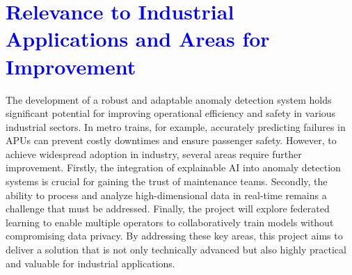 \documentclass[11pt,a4paper]{article}
\begin{document}
\section*{\textcolor{blue}{Relevance to Industrial Applications and Areas for Improvement}}

The development of a robust and adaptable anomaly detection system holds significant potential for improving operational efficiency and safety in various industrial sectors. In metro trains, for example, accurately predicting failures in APUs can prevent costly downtimes and ensure passenger safety. However, to achieve widespread adoption in industry, several areas require further improvement. Firstly, the integration of explainable AI into anomaly detection systems is crucial for gaining the trust of maintenance teams. Secondly, the ability to process and analyze high-dimensional data in real-time remains a challenge that must be addressed. Finally, the project will explore federated learning to enable multiple operators to collaboratively train models without compromising data privacy. By addressing these key areas, this project aims to deliver a solution that is not only technically advanced but also highly practical and valuable for industrial applications.
\end{document}
